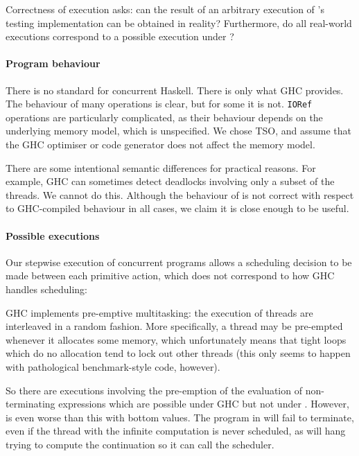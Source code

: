 Correctness of execution asks: can the result of an arbitrary
execution of \dejafu{}'s testing implementation can be obtained in
reality?  Furthermore, do all real-world executions correspond to a
possible execution under \dejafu{}?

\paragraph{Program behaviour}
There is no standard for concurrent Haskell.  There is only what GHC
provides.  The behaviour of many operations is clear, but for some it
is not.  \verb|IORef| operations are particularly complicated, as their
behaviour depends on the underlying memory model, which is
unspecified.  We chose TSO, and assume that the GHC optimiser or code
generator does not affect the memory model.

There are some intentional semantic differences for practical reasons.
For example, GHC can sometimes detect deadlocks involving only a
subset of the threads.  We cannot do this.  Although the behaviour of
\dejafu{} is not correct with respect to GHC-compiled behaviour in all
cases, we claim it is close enough to be useful.

\paragraph{Possible executions}
Our stepwise execution of concurrent programs allows a scheduling
decision to be made between each primitive action, which does not
correspond to how GHC handles scheduling:

\begin{displayquote}
  GHC implements pre-emptive multitasking: the execution of threads
  are interleaved in a random fashion.  More specifically, a thread may
  be pre-empted whenever it allocates some memory, which unfortunately
  means that tight loops which do no allocation tend to lock out other
  threads (this only seems to happen with pathological benchmark-style
  code, however). \parencite{control_concurrent}
\end{displayquote}

So there are executions involving the pre-emption of the evaluation of
non-terminating expressions which are possible under GHC but not under
\dejafu{}.  However, \dejafu{} is even worse than this with bottom
values.  The program in  will fail to terminate, even
if the thread with the infinite computation is never scheduled, as
\dejafu{} will hang trying to compute the continuation so it can call
the scheduler.

